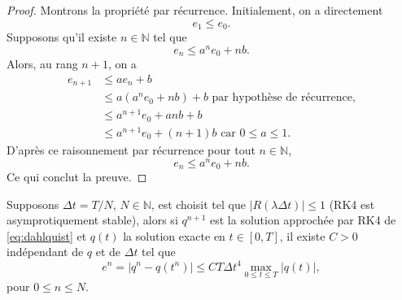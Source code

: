 \begin{proof}
Montrons la propriété par récurrence. Initialement, on a directement
\begin{equation}
e_1 \leq e_0.
\end{equation}
Supposons qu'il existe $n \in \mathbb{N}$ tel que
\begin{equation}
e_n \leq a^n e_0 + nb.
\end{equation}
Alors, au rang $n+1$, on a
\begin{align*}
e_{n+1} & \leq a e_n + b \\
	& \leq a \left( a^n e_0 + nb \right) + b \text{ par hypothèse de récurrence,}  \\
	& \leq a^{n+1} e_0 + anb + b\\
	& \leq a^{n+1} e_0 + (n+1)b \text{ car } 0 \leq a \leq 1.
\end{align*}
D'après ce raisonnement par récurrence pour tout $n \in \mathbb{N}$,
\begin{equation}
e_n \leq a^n e_0 + nb.
\end{equation}
Ce qui conclut la preuve.
\end{proof}

\begin{proposition}
Supposons $\Delta t = T/N$, $N \in \mathbb{N}$, est choisit tel que $|R(\lambda \Delta t ) | \leq 1$ (RK4 est asymprotiquement stable), alors si $q^{n+1}$ est la solution approchée par RK4 de \eqref{eq:dahlquist} et $q(t)$ la solution exacte en $t \in [0,T]$, il existe $C>0$ indépendant de $q$ et de $\Delta t$ tel que
\begin{equation}
e^{n} = | q^{n} - q(t^{n}) | \leq C T \Delta t^4 \max_{0 \leq t \leq T} | q(t) |,
\end{equation}
pour $0 \leq n \leq N$.
\label{prop:consistance_rk4}
\end{proposition}

